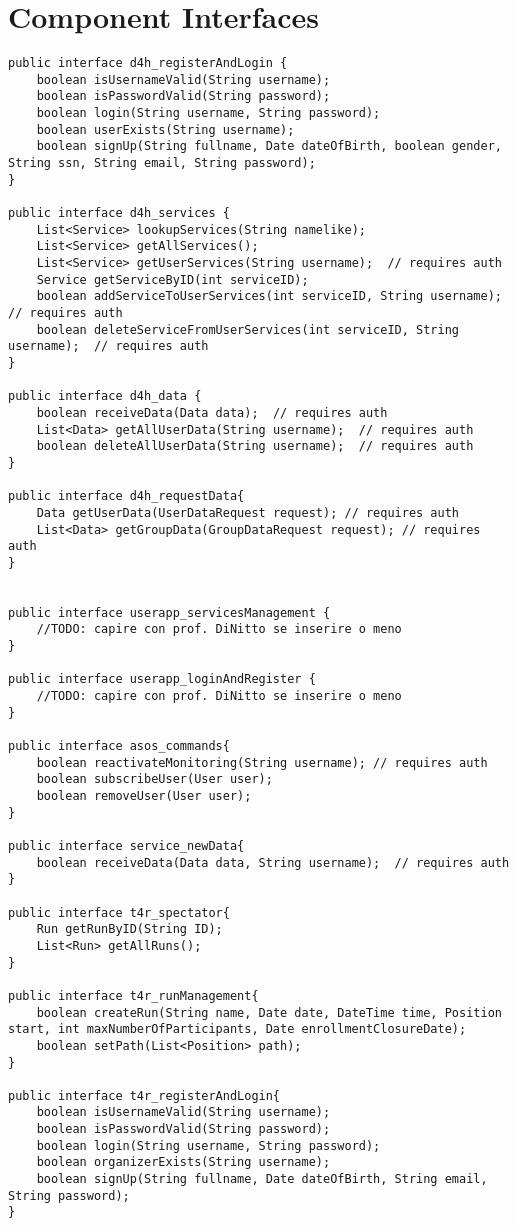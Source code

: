\documentclass[../../DD.tex]{subfiles}
\begin{document}
\section{Component Interfaces}
	\begin{lstlisting}
public interface d4h_registerAndLogin {
	boolean isUsernameValid(String username);
	boolean isPasswordValid(String password);
	boolean login(String username, String password);
	boolean userExists(String username);
	boolean signUp(String fullname, Date dateOfBirth, boolean gender, String ssn, String email, String password);
}

public interface d4h_services {
	List<Service> lookupServices(String namelike);
	List<Service> getAllServices();
	List<Service> getUserServices(String username);  // requires auth
	Service getServiceByID(int serviceID);
	boolean addServiceToUserServices(int serviceID, String username);  // requires auth
	boolean deleteServiceFromUserServices(int serviceID, String username);  // requires auth
}

public interface d4h_data {
	boolean receiveData(Data data);  // requires auth
	List<Data> getAllUserData(String username);  // requires auth
	boolean deleteAllUserData(String username);  // requires auth
}

public interface d4h_requestData{
	Data getUserData(UserDataRequest request); // requires auth
	List<Data> getGroupData(GroupDataRequest request); // requires auth
}


public interface userapp_servicesManagement {
	//TODO: capire con prof. DiNitto se inserire o meno
}

public interface userapp_loginAndRegister {
	//TODO: capire con prof. DiNitto se inserire o meno
}

public interface asos_commands{
	boolean reactivateMonitoring(String username); // requires auth
	boolean subscribeUser(User user);
	boolean removeUser(User user);
}

public interface service_newData{
	boolean receiveData(Data data, String username);  // requires auth
}

public interface t4r_spectator{
	Run getRunByID(String ID);
	List<Run> getAllRuns();
}

public interface t4r_runManagement{
	boolean createRun(String name, Date date, DateTime time, Position start, int maxNumberOfParticipants, Date enrollmentClosureDate);
	boolean setPath(List<Position> path);
}

public interface t4r_registerAndLogin{
	boolean isUsernameValid(String username);
	boolean isPasswordValid(String password);
	boolean login(String username, String password);
	boolean organizerExists(String username);
	boolean signUp(String fullname, Date dateOfBirth, String email, String password);
}


\end{lstlisting}
\end{document}
